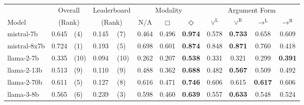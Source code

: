     \small
    \begin{tabular}{
        @{}lllllccccccc@{}
        }
        \toprule
                     & \multicolumn{2}{c}{Overall} & \multicolumn{2}{c}{Leaderboard} & \multicolumn{3}{c}{Modality} & \multicolumn{4}{c}{Argument Form}                                                                                                                              \\
        \cmidrule(lr){6-8} \cmidrule(lr){9-12}
        Model        & \multicolumn{2}{c}{(Rank)}  & \multicolumn{2}{c}{(Rank)}      & N/A                          & $\Box$                            & $\Diamond$ & $\lor^\mathrm{L}$ & $\lor^\mathrm{R}$ & $\to^\mathrm{L}$ & $\to^\mathrm{R}$                                   \\
        \midrule
        mistral-7b   & 0.645                       & (4)                             & 0.145                        & (7)                               & 0.464      & 0.496             & \textbf{0.974}    & 0.578            & \textbf{0.733}   & 0.658          & 0.609          \\
        mistral-8x7b & 0.724                       & (1)                             & 0.193                        & (5)                               & 0.698      & 0.601             & \textbf{0.874}    & 0.848            & \textbf{0.871}   & 0.760          & 0.418          \\
        llama-2-7b   & 0.335                       & (10)                            & 0.094                        & (10)                              & 0.262      & 0.207             & \textbf{0.538}    & 0.331            & 0.321            & 0.299          & \textbf{0.391} \\
        llama-2-13b  & 0.513                       & (9)                             & 0.110                        & (9)                               & 0.488      & 0.362             & \textbf{0.688}    & 0.482            & \textbf{0.567}   & 0.509          & 0.492          \\
        llama-2-70b  & 0.611                       & (5)                             & 0.127                        & (8)                               & 0.616      & 0.471             & \textbf{0.746}    & 0.606            & 0.615            & \textbf{0.617} & 0.606          \\
        llama-3-8b   & 0.565                       & (6)                             & 0.239                        & (3)                               & 0.598      & 0.460             & \textbf{0.639}    & 0.557            & \textbf{0.633}   & 0.548          & 0.524          \\

\end{tabular}
